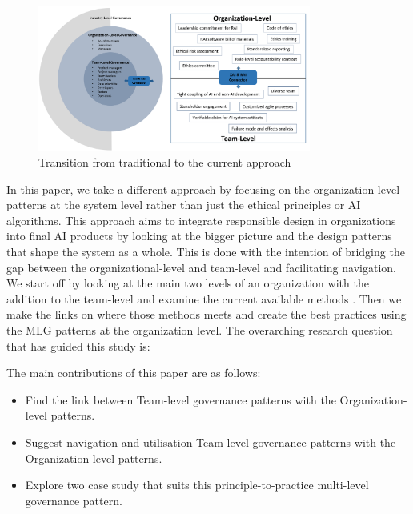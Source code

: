 \documentclass[conference]{IEEEtran}
\begin{document}
\begin{figure}[htbp!!]
	\centering
	\includegraphics[width=0.8\textwidth]{Organization.png}
	\caption{Transition from traditional to the current approach}
	\label{XAIRAIorg}
\end{figure}
In this paper, we take a different approach by focusing on the organization-level patterns at the system level rather than just the ethical principles or AI algorithms. This approach aims to integrate responsible design in organizations into final AI products by looking at the bigger picture and the design patterns that shape the system as a whole. This is done with the intention of bridging the gap between the organizational-level and team-level and facilitating navigation. We start off by looking at the main two levels of an organization with the addition to the team-level and examine the current available methods \cite{Shneiderman, ShneidermanRespo, Jana, Hussain, roadmap}. Then we make the links on where those methods meets and create the best practices using the MLG patterns at the organization level. The overarching research question that has guided this study is:


\vskip 0.1in
\vskip 0.1in

\noindent{}

\vskip 0.1in
\vskip 0.1in

The main contributions of this paper are as follows:
\begin{itemize}
\item Find the link between Team-level governance patterns with the Organization-level patterns.
\item Suggest navigation and utilisation Team-level governance patterns with the Organization-level patterns.
\item Explore two case study that suits this principle-to-practice multi-level governance pattern.
\end{itemize}
\smallskip
\end{document}
